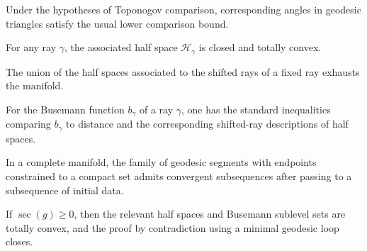 \begin{corollary}
\label{appb-cor-angle-comparison}
Under the hypotheses of Toponogov comparison, corresponding angles in geodesic triangles satisfy the usual lower comparison bound.
\end{corollary}

\begin{lemma}
\label{appb-lem-halfspace-totally-convex}
For any ray $\gamma$, the associated half space $\mathcal H_\gamma$ is closed and totally convex.
\end{lemma}

\begin{lemma}
\label{appb-lem-halfspace-exhaustion}
The union of the half spaces associated to the shifted rays of a fixed ray exhausts the manifold.
\end{lemma}

\begin{lemma}
\label{appb-lem-busemann-basic}
For the Busemann function $b_\gamma$ of a ray $\gamma$, one has the standard inequalities comparing $b_\gamma$ to distance and the corresponding shifted-ray descriptions of half spaces.
\end{lemma}

\begin{lemma}
\label{appb-lem-compactness-geodesic-segments}
In a complete manifold, the family of geodesic segments with endpoints constrained to a compact set admits convergent subsequences after passing to a subsequence of initial data.
\end{lemma}

\begin{proposition}
\label{appb-prop-nonconvexity-contradiction}
If $\sec(g)\ge 0$, then the relevant half spaces and Busemann sublevel sets are totally convex, and the proof by contradiction using a minimal geodesic loop closes.
\end{proposition}

